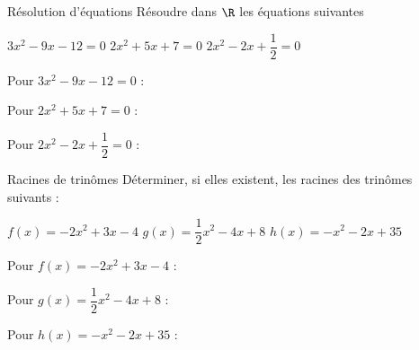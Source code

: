 \vspace{-1mm}
\def\rdifficulty{1.5}
\begin{EXO}{Résolution d'équations}{}
Résoudre dans $\R$ les équations suivantes
\begin{tcbenumerate}[3]
\tcbitem {} $3x^2-9x-12=0$
\tcbitem {} $2x^2+5x+7=0$
\tcbitem {} $2x^2-2x+\dfrac{1}{2}=0$ \\
\end{tcbenumerate}

\exocorrection

\begin{tcbenumerate}[1]
\tcbitem Pour $3x^2-9x-12=0$ :


\tcbitem Pour $2x^2+5x+7=0$ :


\tcbitem Pour $2x^2-2x+\dfrac{1}{2}=0$ :

\end{tcbenumerate}
\end{EXO}

\vspace{-1mm}
\def\rdifficulty{1.5}
\begin{EXO}{Racines de trinômes}{}
Déterminer, si elles existent, les racines des trinômes suivants :
\begin{tcbenumerate}[3]
\tcbitem {} $f(x)=-2x^2+3x-4$
\tcbitem {} $g(x)=\dfrac{1}{2}x^2-4x+8$
\tcbitem {} $h(x)=-x^2-2x+35$ \\
\end{tcbenumerate}

\exocorrection

\begin{tcbenumerate}[1]
\tcbitem Pour $f(x)=-2x^2+3x-4$ :


\tcbitem Pour $g(x)=\dfrac{1}{2}x^2-4x+8$ :


\tcbitem Pour $h(x)=-x^2-2x+35$ :

\end{tcbenumerate}
\end{EXO}

